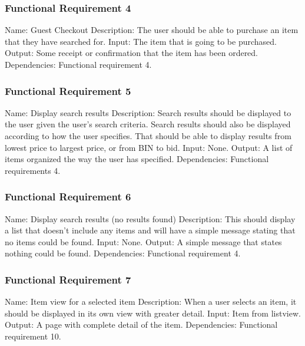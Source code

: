 \documentclass[journal,compsoc, 10pt, draftclsnofoot, onecolumn]{IEEEtran}
\begin{document}
\subsubsection{Functional Requirement 4}
Name: Guest Checkout\newline
Description: The user should be able to purchase an item that they have searched
 for.\newline
Input: The item that is going to be purchased.\newline
Output: Some receipt or confirmation that the item has been ordered.\newline
Dependencies: Functional requirement 4.

\subsubsection{Functional Requirement 5}
Name: Display search results\newline
Description: Search results should be displayed to the user given the user's 
search criteria. Search results should also be displayed according to how the 
user specifies. That should be able to display results from lowest price to 
largest price, or from BIN to bid.\newline
Input: None.\newline
Output: A list of items organized the way the user has specified.\newline
Dependencies: Functional requirements 4.

\subsubsection{Functional Requirement 6}
Name: Display search results (no results found)\newline
Description: This should display a list that doesn't include any items and will 
have a simple message stating that no items could be found. \newline
Input: None.\newline
Output: A simple message that states nothing could be found.\newline
Dependencies: Functional requirement 4.

\subsubsection{Functional Requirement 7}
Name: Item view for a selected item\newline
Description: When a user selects an item, it should be displayed in its own view
 with greater detail.\newline
Input: Item from listview.\newline
Output: A page with complete detail of the item.\newline
Dependencies: Functional requirement 10.
\end{document}
